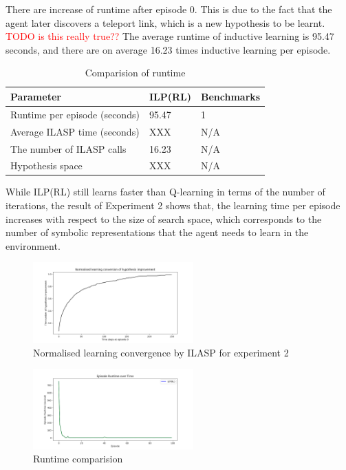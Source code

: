 There are increase of runtime after episode 0.
This is due to the fact that the agent later discovers a teleport link, which is a new hypothesis to be learnt. 
\textcolor{red}{TODO is this really true??}
The average runtime of inductive learning is 95.47 seconds, and there are on average 16.23 times inductive learning per episode.

\begin{table}[!ht!b]
\centering
\begin{tabular}{lll}
\hline
Parameter            & ILP(RL)    & Benchmarks      \\ \hline
Runtime per episode (seconds) & 95.47        & 1        \\
Average ILASP time (seconds)& XXX        & N/A        \\
The number of ILASP calls &  16.23      & N/A       \\
Hypothesis space &  XXX      & N/A       \\
\end{tabular}
\caption{Comparision of runtime}
\label{param}
\end{table}

While ILP(RL) still learns faster than Q-learning in terms of the number of iterations, 
the result of Experiment 2 shows that, the learning time per episode increases with respect to the size of search space, 
which corresponds to the number of symbolic representations that the agent needs to learn in the environment.

\begin{figure}[!htb]
\centering
\includegraphics[width=0.55\textwidth]{./figures/experiment2_ilasp}
\caption{Normalised learning convergence by ILASP for experiment 2}
\label{experiment2_ilasp}
\end{figure}

\begin{figure}[!htb]
\centering
\includegraphics[width=0.55\textwidth]{./figures/experiment2_runtime}
\caption{Runtime comparision}
\label{experiment2_runtime}
\end{figure}

